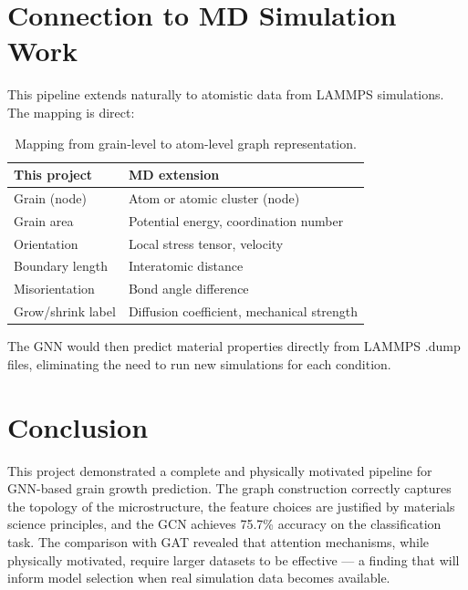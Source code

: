 \documentclass[12pt, a4paper]{article}
\begin{document}
\section{Connection to MD Simulation Work}

This pipeline extends naturally to atomistic data from LAMMPS simulations.
The mapping is direct:

\begin{table}[H]
\centering
\begin{tabular}{ll}
\toprule
\textbf{This project} & \textbf{MD extension} \\
\midrule
Grain (node) & Atom or atomic cluster (node) \\
Grain area & Potential energy, coordination number \\
Orientation & Local stress tensor, velocity \\
Boundary length & Interatomic distance \\
Misorientation & Bond angle difference \\
Grow/shrink label & Diffusion coefficient, mechanical strength \\
\bottomrule
\end{tabular}
\caption{Mapping from grain-level to atom-level graph representation.}
\end{table}

The GNN would then predict material properties directly from LAMMPS .dump
files, eliminating the need to run new simulations for each condition.

\section{Conclusion}

This project demonstrated a complete and physically motivated pipeline for
GNN-based grain growth prediction. The graph construction correctly captures
the topology of the microstructure, the feature choices are justified by
materials science principles, and the GCN achieves 75.7\% accuracy on the
classification task. The comparison with GAT revealed that attention
mechanisms, while physically motivated, require larger datasets to be
effective — a finding that will inform model selection when real simulation
data becomes available.
\end{document}
